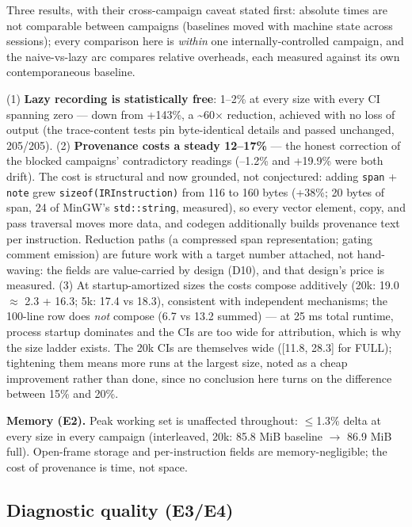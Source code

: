 Three results, with their cross-campaign caveat stated first:
absolute times are not comparable between campaigns (baselines moved
with machine state across sessions); every comparison here is
\emph{within} one internally-controlled campaign, and the naive-vs-lazy
arc compares relative overheads, each measured against its own
contemporaneous baseline.

(1) \textbf{Lazy recording is statistically free}: 1--2\% at every size
with every CI spanning zero --- down from +143\%, a \textasciitilde{}60$\times$ reduction,
achieved with no loss of output (the trace-content tests pin
byte-identical details and passed unchanged, 205/205).
(2) \textbf{Provenance costs a steady 12--17\%} --- the honest correction of
the blocked campaigns' contradictory readings (--1.2\% and +19.9\% were
both drift). The cost is structural and now grounded, not
conjectured: adding \texttt{span} + \texttt{note} grew \texttt{sizeof(IRInstruction)}
from 116 to 160 bytes (+38\%; 20 bytes of span, 24 of MinGW's
\texttt{std::string}, measured), so every vector element, copy, and pass
traversal moves more data, and codegen additionally builds
provenance text per instruction. Reduction paths (a compressed span
representation; gating comment emission) are future work with a
target number attached, not hand-waving: the fields are
value-carried by design (D10), and that design's price is measured.
(3) At startup-amortized sizes the costs compose additively
(20k: 19.0 $\approx$ 2.3 + 16.3; 5k: 17.4 vs 18.3), consistent with
independent mechanisms; the 100-line row does \emph{not} compose (6.7 vs
13.2 summed) --- at 25 ms total runtime, process startup dominates and
the CIs are too wide for attribution, which is why the size ladder
exists. The 20k CIs are themselves wide ([11.8, 28.3] for FULL);
tightening them means more runs at the largest size, noted as a
cheap improvement rather than done, since no conclusion here turns
on the difference between 15\% and 20\%.

\textbf{Memory (E2).} Peak working set is unaffected throughout: $\leq$1.3\%
delta at every size in every campaign (interleaved, 20k: 85.8 MiB
baseline $\rightarrow$ 86.9 MiB full). Open-frame storage and per-instruction
fields are memory-negligible; the cost of provenance is time, not
space.

\subsection{Diagnostic quality (E3/E4)}

